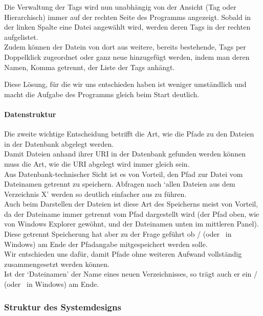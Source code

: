 \documentclass[10pt,paper=a4,final]{scrartcl}
\begin{document}
Die Verwaltung der Tags wird nun unabh\"angig von der Ansicht (Tag oder Hierarchisch) immer auf der rechten Seite des Programms angezeigt. Sobald in der linken Spalte eine Datei angew\"ahlt wird, werden deren Tags in der rechten aufgelistet.\\
Zudem k\"onnen der Datein von dort aus weitere, bereits bestehende, Tags per Doppelklick zugeordnet oder ganz neue hinzugef\"ugt werden, indem man deren Namen, Komma getrennt, der Liste der Tags anh\"angt.

Diese L\"osung, f\"ur die wir uns entschieden haben ist weniger umst\"andlich und macht die Aufgabe des Programms gleich beim Start deutlich.
\paragraph{Datenstruktur}
Die zweite wichtige Entscheidung betrifft die Art, wie die Pfade zu den Dateien in der Datenbank abgelegt werden.\\
Damit Dateien anhand ihrer URI in der Datenbank gefunden werden k\"onnen muss die Art, wie die URI abgelegt wird immer gleich sein.\\
Aus Datenbank-technischer Sicht ist es von Vorteil, den Pfad zur Datei vom Dateinamen getrennt zu speichern. Abfragen nach ‘allen Dateien aus dem Verzeichnis X’ werden so deutlich einfacher aus zu f\"uhren.\\
Auch beim Darstellen der Dateien ist diese Art des Speicherns meist von Vorteil, da der Dateiname immer getrennt vom Pfad dargestellt wird (der Pfad oben, wie von Windows Explorer gew\"ohnt, und der Dateinamen unten im mittleren Panel).\\
Diese getrennt Speicherung hat aber zu der Frage gef\"uhrt ob / (oder \ in Windows) am Ende der Pfadangabe mitgespeichert werden solle.\\
Wir entschieden uns daf\"ur, damit Pfade ohne weiteren Aufwand vollst\"andig zusammengesetzt werden k\"onnen.\\
Ist der ‘Dateinamen’ der Name eines neuen Verzeichnisses, so tr\"agt auch er ein / (oder \ in Windows) am Ende.
\subsubsection{Struktur des Systemdesigns}
\end{document}
